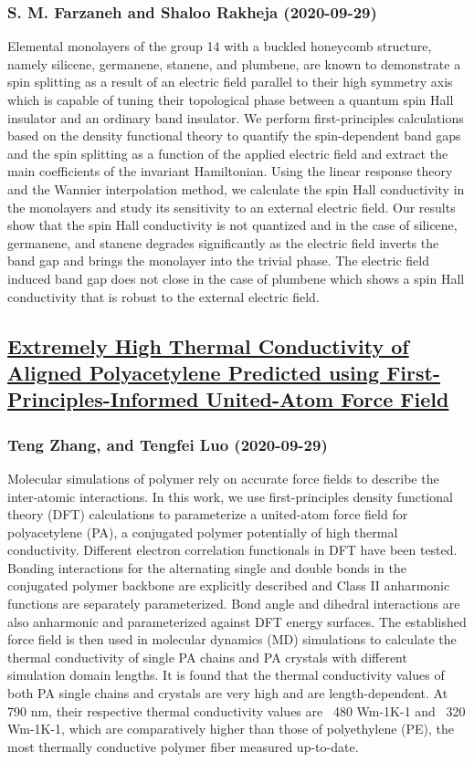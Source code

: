 \subsubsection*{S. M. Farzaneh and Shaloo Rakheja (2020-09-29)}
Elemental monolayers of the group 14 with a buckled honeycomb structure,
namely silicene, germanene, stanene, and plumbene, are known to demonstrate a
spin splitting as a result of an electric field parallel to their high symmetry
axis which is capable of tuning their topological phase between a quantum spin
Hall insulator and an ordinary band insulator. We perform first-principles
calculations based on the density functional theory to quantify the
spin-dependent band gaps and the spin splitting as a function of the applied
electric field and extract the main coefficients of the invariant Hamiltonian.
Using the linear response theory and the Wannier interpolation method, we
calculate the spin Hall conductivity in the monolayers and study its
sensitivity to an external electric field. Our results show that the spin Hall
conductivity is not quantized and in the case of silicene, germanene, and
stanene degrades significantly as the electric field inverts the band gap and
brings the monolayer into the trivial phase. The electric field induced band
gap does not close in the case of plumbene which shows a spin Hall conductivity
that is robust to the external electric field.

\subsection*{\href{http://arxiv.org/abs/2009.13708v1}{Extremely High Thermal Conductivity of Aligned Polyacetylene Predicted  using First-Principles-Informed United-Atom Force Field}}
\subsubsection*{Teng Zhang, and Tengfei Luo (2020-09-29)}
Molecular simulations of polymer rely on accurate force fields to describe
the inter-atomic interactions. In this work, we use first-principles density
functional theory (DFT) calculations to parameterize a united-atom force field
for polyacetylene (PA), a conjugated polymer potentially of high thermal
conductivity. Different electron correlation functionals in DFT have been
tested. Bonding interactions for the alternating single and double bonds in the
conjugated polymer backbone are explicitly described and Class II anharmonic
functions are separately parameterized. Bond angle and dihedral interactions
are also anharmonic and parameterized against DFT energy surfaces. The
established force field is then used in molecular dynamics (MD) simulations to
calculate the thermal conductivity of single PA chains and PA crystals with
different simulation domain lengths. It is found that the thermal conductivity
values of both PA single chains and crystals are very high and are
length-dependent. At 790 nm, their respective thermal conductivity values are
~480 Wm-1K-1 and ~320 Wm-1K-1, which are comparatively higher than those of
polyethylene (PE), the most thermally conductive polymer fiber measured
up-to-date.

